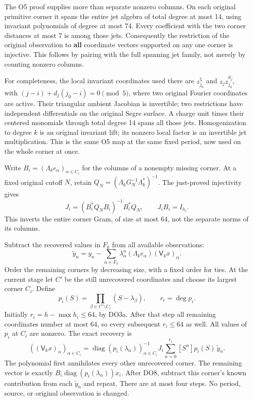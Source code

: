 \documentclass[11pt]{article}
\begin{document}
The O5 proof supplies more than separate nonzero columns. On each original primitive corner it spans the entire jet algebra of total degree at most 14, using invariant polynomials of degree at most 74. Every coefficient with the two corner distances at most 7 is among those jets. Consequently the restriction of the original observation to \textbf{all} coordinate vectors supported on any one corner is injective. This follows by pairing with the full spanning jet family, not merely by counting nonzero columns.

For completeness, the local invariant coordinates used there are \(z_{j_0}^5\) and \(z_jz_{j_0}^{d_j}\), with \((j-i)+d_j(j_0-i)=0\pmod5\), where two original Fourier coordinates are active. Their triangular ambient Jacobian is invertible; two restrictions have independent differentials on the original Segre surface. A charge unit times their centered monomials through total degree 14 spans all those jets. Homogenization to degree \(k\) is an original invariant lift; its nonzero local factor is an invertible jet multiplication. This is the same O5 map at the same fixed period, now used on the whole corner at once.

Write \(B_i=(\Lambda_k e_\alpha)_{\alpha\in C_i}\) for the columns of a nonempty missing corner. At a fixed original cutoff \(N\), retain \(Q_N=(\Lambda_kG_N^{-1}\Lambda_k^*)^{-1}\). The just-proved injectivity gives \[
J_i=(B_i^*Q_NB_i)^{-1}B_i^*Q_N,\qquad J_iB_i=I_{h_i}.
\tag{DO7}
\] This inverts the entire corner Gram, of size at most 64, not the separate norms of its columns.

Subtract the recovered values in \(F_k\) from all available observations: \[
\widetilde y_n=y_n-\sum_{\alpha\in F_k}
\lambda_\alpha^n(\Lambda_k e_\alpha)(\mathsf V_kx)_\alpha.
\] Order the remaining corners by decreasing size, with a fixed order for ties. At the current stage let \(C'\) be the still unrecovered coordinates and choose its largest corner \(C_i\). Define \[
p_i(S)=\prod_{\beta\in C'\setminus C_i}(S-\lambda_\beta),\qquad
r_i=\deg p_i.
\] Initially \(r_i=h-\max h_i\le64\), by DO3a. After that step all remaining coordinates number at most 64, so every subsequent \(r_i\le64\) as well. All values of \(p_i\) at \(C_i\) are nonzero. The exact recovery is \[
\boxed{\displaystyle
((\mathsf V_kx)_\alpha)_{\alpha\in C_i}
=\operatorname{diag}(p_i(\lambda_\alpha))_{\alpha\in C_i}^{-1}
J_i\sum_{n=0}^{r_i}[S^n]p_i(S)\,\widetilde y_n.}
\tag{DO8}
\] The polynomial first annihilates every other unrecovered corner. The remaining vector is exactly \(B_i\operatorname{diag}(p_i(\lambda_\alpha))x_i\). After DO8, subtract this corner's known contribution from each \(\widetilde y_n\) and repeat. There are at most four steps. No period, source, or original observation is changed.
\end{document}
